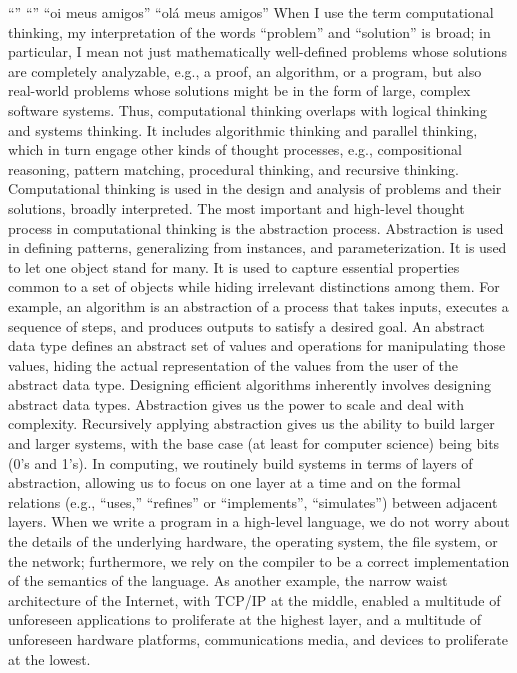 \documentclass{book}
\begin{document}
``''
``''
``oi meus amigos''
``olá meus amigos''
When I use the term computational thinking, my interpretation of the words “problem” and “solution” is broad; in particular, I mean not just mathematically well-defined problems whose solutions are completely analyzable, e.g., a proof, an algorithm, or a program, but also real-world problems whose solutions might be in the form of large, complex software systems. Thus, computational thinking overlaps with logical thinking and systems thinking. It includes algorithmic thinking and parallel thinking, which in turn engage other kinds of thought processes, e.g., compositional reasoning, pattern matching, procedural thinking, and recursive thinking.
Computational thinking is used in the design and analysis of problems and their solutions, broadly interpreted. The most important and high-level thought process in computational thinking is the abstraction process. Abstraction is used in defining patterns, generalizing from instances, and parameterization. It is used to let one object stand for many. It is used to capture essential properties common to a set of objects while hiding irrelevant distinctions among them. For example, an algorithm is an abstraction of a process that takes inputs, executes a sequence of steps, and produces outputs to satisfy a desired goal. An abstract data type defines an abstract set of values and operations for manipulating those values, hiding the actual representation of the values from the user of the abstract data type. Designing efficient algorithms inherently involves designing abstract data types. Abstraction gives us the power to scale and deal with complexity.
Recursively applying abstraction gives us the ability to build larger and larger systems, with the base case (at least for computer science) being bits (0’s and 1’s). In computing, we routinely build systems in terms of layers of abstraction, allowing us to focus on one layer at a time and on the formal relations (e.g., “uses,” “refines” or “implements”, “simulates”) between adjacent layers. When we write a program in a high-level language, we do not worry about the details of the underlying hardware, the operating system, the file system, or the network; furthermore, we rely on the compiler to be a correct implementation of the semantics of the language. As another example, the narrow waist architecture of the Internet, with TCP/IP at the middle, enabled a multitude of unforeseen applications to proliferate at the highest layer, and a multitude of unforeseen hardware platforms, communications media, and devices to proliferate at the lowest.
\end{document}
